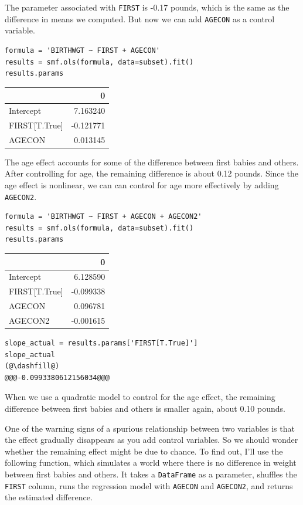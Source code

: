 The parameter associated with \passthrough{\lstinline!FIRST!} is -0.17
pounds, which is the same as the difference in means we computed. But
now we can add \passthrough{\lstinline!AGECON!} as a control variable.

\begin{lstlisting}[]
formula = 'BIRTHWGT ~ FIRST + AGECON'
results = smf.ols(formula, data=subset).fit()
results.params
\end{lstlisting}

\begin{tabular}{lr}
\midrule
{} &         0 \\
\midrule
Intercept     &  7.163240 \\
FIRST[T.True] & -0.121771 \\
AGECON        &  0.013145 \\
\midrule
\end{tabular}

The age effect accounts for some of the difference between first babies
and others. After controlling for age, the remaining difference is about
0.12 pounds. Since the age effect is nonlinear, we can can control for
age more effectively by adding \passthrough{\lstinline!AGECON2!}.

\begin{lstlisting}[]
formula = 'BIRTHWGT ~ FIRST + AGECON + AGECON2'
results = smf.ols(formula, data=subset).fit()
results.params
\end{lstlisting}

\begin{tabular}{lr}
\midrule
{} &         0 \\
\midrule
Intercept     &  6.128590 \\
FIRST[T.True] & -0.099338 \\
AGECON        &  0.096781 \\
AGECON2       & -0.001615 \\
\midrule
\end{tabular}

\begin{lstlisting}[]
slope_actual = results.params['FIRST[T.True]']
slope_actual
(@\dashfill@)
@@@-0.0993380612156034@@@
\end{lstlisting}

When we use a quadratic model to control for the age effect, the
remaining difference between first babies and others is smaller again,
about 0.10 pounds.

One of the warning signs of a spurious relationship between two
variables is that the effect gradually disappears as you add control
variables. So we should wonder whether the remaining effect might be due
to chance. To find out, I'll use the following function, which simulates
a world where there is no difference in weight between first babies and
others. It takes a \passthrough{\lstinline!DataFrame!} as a parameter,
shuffles the \passthrough{\lstinline!FIRST!} column, runs the regression
model with \passthrough{\lstinline!AGECON!} and
\passthrough{\lstinline!AGECON2!}, and returns the estimated difference.


